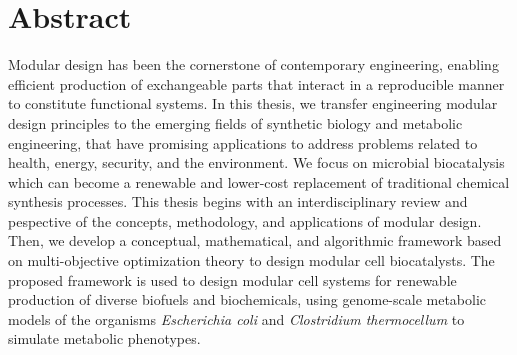\chapter*{Abstract}\label{ch:abstract}
Modular design has been the cornerstone of contemporary engineering, enabling efficient production of exchangeable parts that interact in a reproducible manner to constitute functional systems.
    In this thesis, we transfer engineering modular design principles to the emerging fields of synthetic biology and metabolic engineering, that have promising applications to address problems related to health, energy, security, and the environment.
    We focus on microbial biocatalysis which can become a renewable and lower-cost replacement of traditional chemical synthesis processes.
    This thesis begins with an interdisciplinary review and pespective of the concepts, methodology, and applications of modular design.
    Then, we develop a conceptual, mathematical, and algorithmic framework based on multi-objective optimization theory to design modular cell biocatalysts.
    The proposed framework is used to design modular cell systems for renewable production of diverse biofuels and biochemicals, using
    genome-scale metabolic models of the organisms \textit{Escherichia coli} and \textit{Clostridium thermocellum} to simulate metabolic phenotypes.
